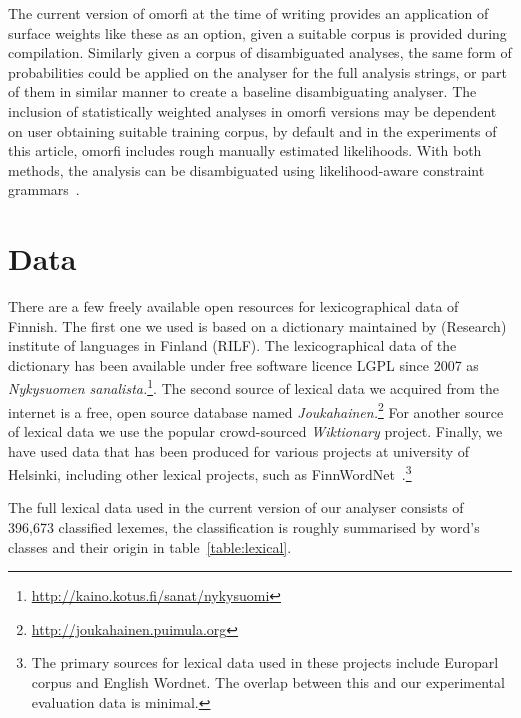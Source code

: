 \documentclass[a4paper,12pt]{article}
\begin{document}
The current version of omorfi at the time of writing provides an application
of surface weights like these as an option, given a suitable corpus is
provided during compilation. Similarly given a corpus of disambiguated
analyses, the same form of probabilities could be applied on the analyser
for the full analysis strings, or part of them in similar manner to create a
baseline disambiguating analyser. The inclusion of statistically weighted
analyses in omorfi versions may be dependent on user obtaining suitable
training corpus, by default and in the experiments of this article, omorfi
includes rough manually estimated likelihoods. With both methods, the
analysis can be disambiguated using likelihood-aware constraint
grammars~\cite{pirinen2015using}.

\section{Data}
\label{sec:data}

There are a few freely available open resources for lexicographical data of
Finnish. The first one  we used is based on a dictionary maintained by
(Research) institute of languages in Finland (RILF). The lexicographical data
of the dictionary has been available under free software licence LGPL since
2007 as \textit{Nykysuomen
sanalista.}\footnote{\url{http://kaino.kotus.fi/sanat/nykysuomi}}.  The second
source of lexical data we acquired from the internet is a free, open source
database named
\textit{Joukahainen.}\footnote{\url{http://joukahainen.puimula.org}}  For another
source of lexical data we use the popular crowd-sourced \textit{Wiktionary}
project.  Finally, we have used data that has been produced for various
projects at university of Helsinki, including other lexical projects, such as
FinnWordNet~\citep{linden2010finnwordnet}.\footnote{The primary sources for
lexical data used in these projects include Europarl corpus and English
Wordnet.  The overlap between this and our experimental evaluation data is
minimal.} 

The full lexical data used in the current version of our analyser consists of
396,673 classified lexemes, the classification is roughly summarised by word's
classes and their origin in table~\ref{table:lexical}. 
\end{document}
